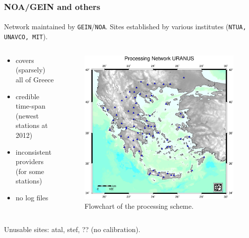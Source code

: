\documentclass{beamer}
\begin{document}
\begin{frame}\frametitle{NOA/GEIN and others}\framesubtitle{}
  Network maintained by \texttt{GEIN}/\texttt{NOA}\footnotemark. Sites established by various institutes
  (\texttt{NTUA, UNAVCO, MIT}).
\begin{columns}[T] %
\begin{column}{.48\textwidth}
  \begin{itemize}
    \item<pro@1-> covers (sparsely) all of Greece 
    \item<pro@1-> credible time-span (newest stations at 2012)
    \item<con@1-> inconsistent providers (for some stations)
    \item<con@1-> no log files
  \end{itemize}
\end{column}%
\hfill%
\begin{column}{.68\textwidth}
 \begin{figure}
 \begin{center}
 \includegraphics[width=.5\textwidth]{img/uranusnet.eps}
 \caption{Flowchart of the processing scheme.}
 \label{fig:dgrm}
 \end{center}
 \end{figure}
\end{column}%
\end{columns}
  \begin{block}{}
    Unusable sites: atal, stef, ?? (no calibration).
  \end{block}
\end{frame}
\end{document}
